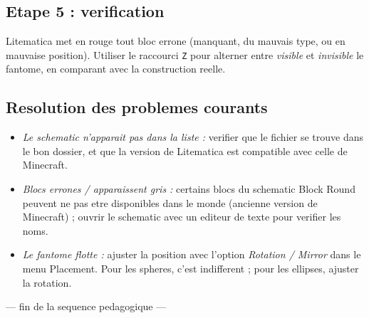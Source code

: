 \documentclass[12pt,a4paper]{scrartcl}
\begin{document}
\subsection{Etape 5 : verification}
Litematica met en rouge tout bloc errone (manquant, du mauvais type, ou en mauvaise position). Utiliser le raccourci \texttt{Z} pour alterner entre \emph{visible} et \emph{invisible} le fantome, en comparant avec la construction reelle.

\subsection{Resolution des problemes courants}
\begin{itemize}[leftmargin=1.3em,itemsep=0.15em,topsep=0.3em,nosep]
  \item \emph{Le schematic n'apparait pas dans la liste :} verifier que le fichier se trouve dans le bon dossier, et que la version de Litematica est compatible avec celle de Minecraft.
  \item \emph{Blocs errones / apparaissent gris :} certains blocs du schematic Block Round peuvent ne pas etre disponibles dans le monde (ancienne version de Minecraft) ; ouvrir le schematic avec un editeur de texte pour verifier les noms.
  \item \emph{Le fantome flotte :} ajuster la position avec l'option \emph{Rotation / Mirror} dans le menu Placement. Pour les spheres, c'est indifferent ; pour les ellipses, ajuster la rotation.
\end{itemize}

\vspace{2em}
\begin{center}
\color{muted}\small\sffamily
--- fin de la sequence pedagogique ---
\end{center}
\end{document}
